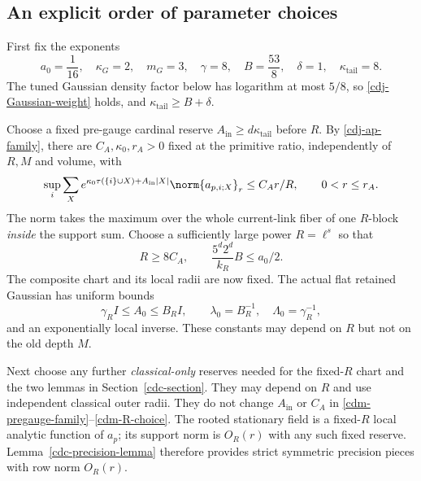 \subsection{An explicit order of parameter choices}
\label{cdm-parameters-section}

First fix the exponents
\begin{equation}
 a_0=\frac1{16},\quad \kappa_G=2,\quad m_G=3,\quad
 \gamma=8,\quad B=\frac{53}{8},\quad \delta=1,\quad
 \kappa_{\mathrm{tail}}=8.
 \label{cdm-exponents}
\end{equation}
The tuned Gaussian density factor below has logarithm at most
$5/8$, so \eqref{cdj-Gaussian-weight} holds, and
$\kappa_{\mathrm{tail}}\ge B+\delta$.

Choose a fixed pre-gauge cardinal reserve
$A_{\mathrm{in}}\ge d\kappa_{\mathrm{tail}}$ before $R$.
By \eqref{cdj-ap-family}, there are $C_A,\kappa_0,r_A>0$ fixed
at the primitive ratio, independently of $R,M$ and volume, with
\begin{equation}
 \sup_i\sum_Xe^{\kappa_0\tau(\{i\}\cup X)+A_{\mathrm{in}}|X|}
                  \norm{a_{p,i;X}}_r
       \le C_A r/R,\qquad 0<r\le r_A.
 \label{cdm-pregauge-family}
\end{equation}
The norm takes the maximum over the whole current-link fiber
of one $R$-block \emph{inside} the support sum.
Choose a sufficiently large power $R=\ell^s$ so that
\begin{equation}
 R\ge8C_A,\qquad
 \frac{5^d2^d}{k_R}B\le a_0/2.
 \label{cdm-R-choice}
\end{equation}
The composite chart and its local radii are now fixed. The actual
flat retained Gaussian has uniform bounds
\begin{equation}
 \gamma_RI\le A_0\le B_RI,\qquad
 \lambda_0=B_R^{-1},\quad \Lambda_0=\gamma_R^{-1},
 \label{cdm-spectral-bounds}
\end{equation}
and an exponentially local inverse. These constants may depend
on $R$ but not on the old depth $M$.

Next choose any further \emph{classical-only} reserves needed
for the fixed-$R$ chart and the two lemmas in
Section~\ref{cdc-section}. They may depend on $R$ and use
independent classical outer radii. They do not change
$A_{\mathrm{in}}$ or $C_A$ in
\eqref{cdm-pregauge-family}--\eqref{cdm-R-choice}.
The rooted stationary field is a fixed-$R$ local analytic
function of $a_p$; its support norm is $O_R(r)$ with any such
fixed reserve. Lemma~\ref{cdc-precision-lemma} therefore
provides strict symmetric precision pieces with row norm
$O_R(r)$.

